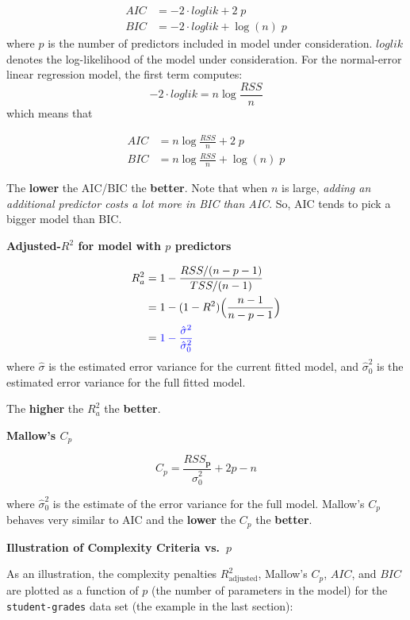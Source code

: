 \documentclass[
]{book}
\begin{document}
\begin{align*}
AIC &= -2\cdot loglik  + 2\; p \\
BIC &= -2\cdot loglik  + \log(n)\; p
\end{align*}
where \(p\) is the number of predictors included in model under consideration. \(loglik\) denotes the log-likelihood of the model under consideration. For the normal-error linear regression model, the first term computes:
\[-2 \cdot  loglik = n\log \frac{RSS}{n} \]
which means that

\begin{align*}
AIC &= n\log \frac{RSS}{n} + 2\; p\\
BIC &= n\log \frac{RSS}{n} + \log(n)\; p
\end{align*}

The \textbf{lower} the AIC/BIC the \textbf{better}. Note that when \(n\) is large, \emph{adding an additional predictor costs a lot more in BIC than AIC}. So, AIC tends to pick a bigger model than BIC.

\textbf{Adjusted-\(R^2\) for model with \(p\) predictors}

\begin{align*}
R^2_a & = 1-\frac{RSS/(n-p-1)}{TSS/(n-1)}\\
& = 1- (1-R^2)\Bigl(\frac{n-1}{n-p-1}\Bigr)\\
& = {\color{blue}{1-\frac{\hat{\sigma}^2}{\hat{\sigma}^2_0}}}
\end{align*}
where \(\hat{\sigma}\) is the estimated error variance for the current fitted model, and \(\hat{\sigma}^2_0\) is the estimated error variance for the full fitted model.

The \textbf{higher} the \(R^2_a\) the \textbf{better}.

\textbf{Mallow's \(C_p\)}

\[C_p = \frac{RSS_{\mathbf{p}}}{\hat{\sigma}_0^2} +2p-n\]

where \(\hat{\sigma}_0^2\) is the estimate of the error variance for the full model.
Mallow's \(C_p\) behaves very similar to AIC and the \textbf{lower} the \(C_p\) the \textbf{better}.

\textbf{Illustration of Complexity Criteria vs.~\(p\)}

As an illustration, the complexity penalties \(R^2_{\text{adjusted}}\), Mallow's \(C_p\), \(AIC\), and \(BIC\) are plotted as a function of \(p\) (the number of parameters in the model) for the \texttt{student-grades} data set (the example in the last section):
\end{document}
